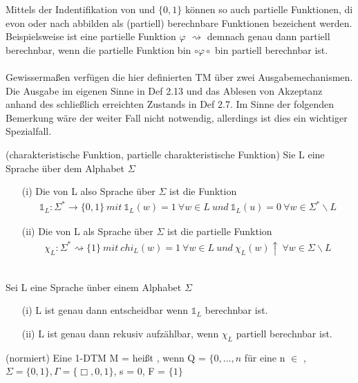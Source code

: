 \documentclass[a4paper]{article}
\begin{document}
 Mittels der Indentifikation von \NN und $\lbrace 0,1 \rbrace$ können so auch partielle Funktionen, di evon oder nach \NN abbilden als (partiell) berechnbare Funktionen bezeichent werden. Beispielsweise ist eine partielle Funktion $\varphi$ \NN $\rightsquigarrow$ \NN demnach genau dann partiell berechnbar, wenn die partielle Funktion bin $\circ \varphi \circ$ bin partiell berechnbar ist. \\
 \\
 Gewissermaßen verfügen die hier definierten TM über zwei Ausgabemechanismen. Die Ausgabe im eigenen Sinne in Def 2.13 und das Ablesen von Akzeptanz anhand des schließlich erreichten Zustands in Def 2.7. Im Sinne der folgenden Bemerkung wäre der weiter Fall nicht notwendig, allerdings ist dies ein wichtiger Spezialfall.
 \begin{DefBox}{(charakteristische Funktion, partielle charakteristische Funktion)}
  Sie L eine Sprache über dem Alphabet $\Sigma$
  \begin{itemize}
   \item[(i)] Die  von L also Sprache über $\Sigma$ ist die Funktion
   \begin{align*}
    \mathds{1}_L: \Sigma^* \rightarrow \lbrace 0,1 \rbrace \ mit \ \mathds{1}_L(w) = 1 \ \forall w \in L \ und \ \mathds{1}_L (u) = 0 \ \forall w \in \Sigma^* \backslash L
   \end{align*}
   \item[(ii)] Die  von L als Sprache über $\Sigma$ ist die partielle Funktion
   \begin{align*}
      \chi_L : \Sigma^* \rightsquigarrow \lbrace 1 \rbrace \ mit \ chi_L(w) = 1 \ \forall w \in L \ und \ \chi_L(w) \uparrow \ \forall w \in \Sigma \backslash L
   \end{align*}
  \end{itemize}
 \end{DefBox}

  \\ \stepBoxCounter
 Sei L eine Sprache ünber einem Alphabet $\Sigma$
 \begin{itemize}
  \item[(i)] L ist genau dann entscheidbar wenn $\mathds{1}_L$ berechnbar ist.
  \item[(ii)] L ist genau dann rekusiv aufzählbar, wenn $\chi_L$ partiell berechnbar ist.
 \end{itemize}

 \begin{DefBox}{(normiert)}
  Eine 1-DTM M = \TM heißt , wenn Q = $\lbrace 0,\dots,n$ für eine n $\in$ \NN, $\Sigma = \lbrace 0,1 \rbrace, \Gamma = \lbrace \Box, 0,1 \rbrace$, s = 0, F = $\lbrace 1 \rbrace$
 \end{DefBox}
\end{document}
